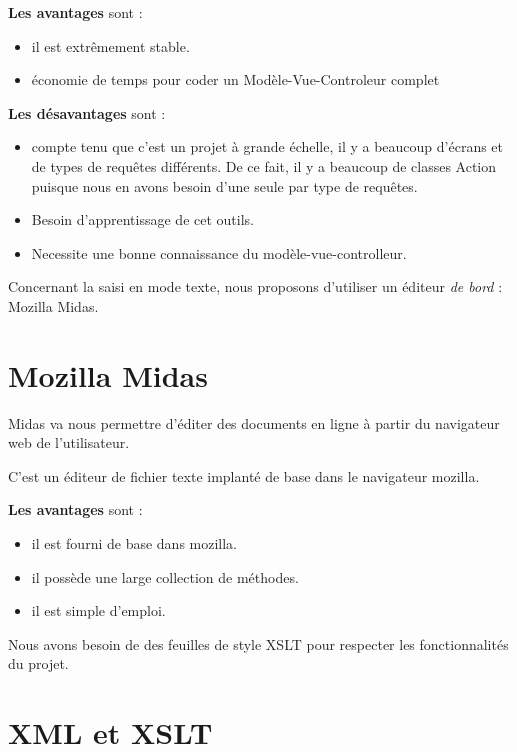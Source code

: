 {\bf Les avantages} sont :
\begin{itemize}
\item il est extr{\^e}mement stable.
\item {\'e}conomie de temps pour coder un Mod{\`e}le-Vue-Controleur complet\\
\end{itemize}

{\bf Les d{\'e}savantages} sont :
\begin{itemize}
\item compte tenu que c'est un projet {\`a} grande {\'e}chelle, il y a beaucoup d'{\'e}crans et de types de requ{\^e}tes diff{\'e}rents. De ce fait, il y a beaucoup de classes Action puisque nous en avons besoin d'une seule par type de requ{\^e}tes.
\item Besoin d'apprentissage de cet outils.
\item Necessite une bonne connaissance du mod{\`e}le-vue-controlleur.\\
\end{itemize}

Concernant la saisi en mode texte, nous proposons d'utiliser un
{\'e}diteur {\it de bord} : Mozilla Midas.\\

\section{Mozilla Midas}
Midas va nous permettre d'{\'e}diter des documents en ligne {\`a} partir du navigateur web de l'utilisateur.

C'est un {\'e}diteur de fichier texte implant{\'e} de base dans le navigateur mozilla.

{\bf Les avantages} sont :
\begin{itemize}
\item il est fourni de base dans mozilla.
\item il poss{\`e}de une large collection de m{\'e}thodes.
\item il est simple d'emploi.\\
\end{itemize}

Nous avons besoin de des feuilles de style XSLT pour respecter les
fonctionnalit{\'e}s du projet.\\

\section{XML et XSLT}

